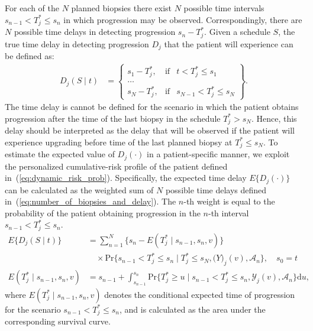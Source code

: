 For each of the $N$ planned biopsies there exist $N$ possible time intervals ${s_{n-1} < T^*_j \leq s_n}$ in which progression may be observed. Correspondingly, there are $N$ possible time delays in detecting progression $s_n - T^*_j$. Given a schedule $S$, the true time delay in detecting progression $D_j$ that the patient will experience can be defined as:
\begin{equation}
\label{eq:number_of_biopsies_and_delay}
\begin{split}
D_j (S \mid t) &= \left\{ \begin{array}{lcrr}
  s_1 - T^*_j, &\mbox{if}& t < T^*_j \leq s_1\\
  \ldots \\
  s_N - T^*_j, &\mbox{if}& s_{N-1} < T^*_j \leq s_N  
\end{array} \right\}.
\end{split}
\end{equation}
The time delay is cannot be defined for the scenario in which the patient obtains progression after the time of the last biopsy in the schedule $T^*_j > s_N$. Hence, this delay should be interpreted as the delay that will be observed if the patient will experience upgrading before time of the last planned biopsy at $T^*_j\leq s_N$. To estimate the expected value of $D_j(\cdot)$ in a patient-specific manner, we exploit the personalized cumulative-risk profile of the patient defined in~(\ref{eq:dynamic_risk_prob}). Specifically, the expected time delay $E\{D_j(\cdot)\}$ can be calculated as the weighted sum of $N$ possible time delays defined in~(\ref{eq:number_of_biopsies_and_delay}). The $n$-th weight is equal to the probability of the patient obtaining progression in the $n$-th interval ${s_{n-1} < T^*_j \leq s_n}$.
\begin{equation*}
\label{eq:expected_number_of_biopsies_and_delay}
\begin{split}
E\big\{D_j(S \mid t)\big\} &= \sum_{n=1}^{N} \Big\{s_n - E(T^*_j \mid s_{n-1}, s_n, v)\Big\} \\ & \quad \times \mbox{Pr}\Big\{s_{n-1} < T^*_j \leq s_n \mid T^*_j \leq s_N, \mathcal(Y)_j(v), \mathcal{A}_n\Big\}, \quad s_0 = t\\
E(T^*_j \mid s_{n-1}, s_n, v) &= s_{n-1} + \int_{s_{n-1}}^{s_n} \mbox{Pr}\Big\{T^*_j \geq u \mid s_{n-1} < T^*_j \leq s_n, \mathcal{Y}_{j}(v), \mathcal{A}_n\Big\} \mathrm{d}u,
\end{split}
\end{equation*}
where $E(T^*_j \mid s_{n-1}, s_n, v)$ denotes the conditional expected time of progression for the scenario $s_{n-1} < T^*_j \leq s_n$, and is calculated as the area under the corresponding survival curve.

